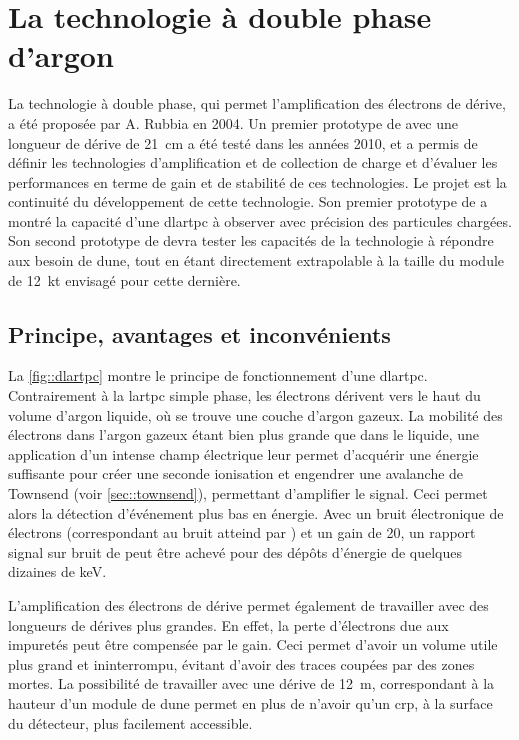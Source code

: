     
  \section{La technologie à double phase d'argon}

    La technologie à double phase, qui permet l'amplification des électrons de dérive, a été proposée par A. Rubbia\cite{Rubbia2004} en 2004. Un premier prototype de \threeL{} avec une longueur de dérive de \SI{21}{\centi\meter} a été testé dans les années 2010, et a permis de définir les technologies d'amplification et de collection de charge\cite{Cantini2013} et d'évaluer les performances en terme de gain et de stabilité de ces technologies\cite{Cantini2014}. Le projet \protodp{} est la continuité du développement de cette technologie. Son premier prototype de \TOO{} a montré la capacité d'une \gls{dlartpc} à observer avec précision des particules chargées. Son second prototype de \SSS{} devra tester les capacités de la technologie à répondre aux besoin de \gls{dune}, tout en étant directement extrapolable à la taille du module de \SI{12}{\kilo\tonne} envisagé pour cette dernière.

    \subsection{Principe, avantages et inconvénients}

      La \autoref{fig::dlartpc} montre le principe de fonctionnement d'une \gls{dlartpc}. Contrairement à la \gls{lartpc} simple phase, les électrons dérivent vers le haut du volume d'argon liquide, où se trouve une couche d'argon gazeux. La mobilité des électrons dans l'argon gazeux étant bien plus grande que dans le liquide, une application d'un intense champ électrique leur permet d'acquérir une énergie suffisante pour créer une seconde ionisation et engendrer une avalanche de Townsend (voir \autoref{sec::townsend}), permettant d'amplifier le signal. Ceci permet alors la détection d'événement plus bas en énergie. Avec un bruit électronique de  électrons (correspondant au bruit atteind par \protosp{}) et un gain de 20, un rapport signal sur bruit de  peut être achevé pour des dépôts d'énergie de quelques dizaines de \si{\kilo\eV}.
      
      L'amplification des électrons de dérive permet également de travailler avec des longueurs de dérives plus grandes. En effet, la perte d'électrons due aux impuretés peut être compensée par le gain. Ceci permet d'avoir un volume utile plus grand et ininterrompu, évitant d'avoir des traces coupées par des zones mortes. La possibilité de travailler avec une dérive de \SI{12}{\meter}, correspondant à la hauteur d'un module de \gls{dune} permet en plus de n'avoir qu'un \gls{crp}, à la surface du détecteur, plus facilement accessible.

